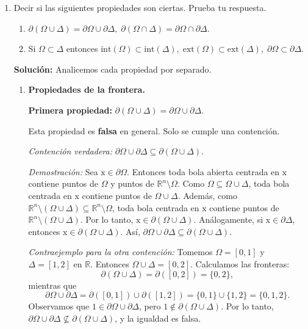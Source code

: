 \documentclass[12pt]{article}
\newcommand{\Ext}{\mathrm{ext}}
\newcommand{\Int}{\mathrm{int}}
\newcommand{\R}{\mathbb R}
\newcommand{\x}{\mathrm x}
\begin{document}
\begin{enumerate}
\item Decir si las siguientes propiedades son ciertas. Prueba tu respuesta.
\begin{enumerate}[(1)]
\item $\partial(\Omega\cup \Delta) = \partial \Omega\cup \partial \Delta,\; 
\partial(\Omega\cap \Delta) = \partial \Omega\cap \partial \Delta$.
\item Si $\Omega\subset \Delta$ entonces $\Int(\Omega)\subset \Int(\Delta),\; \Ext(\Omega)\subset \Ext(\Delta),\; \partial \Omega\subset \partial \Delta$.
\end{enumerate}

\textbf{Solución: } Analicemos cada propiedad por separado.

\begin{enumerate}[(1)]
\item \textbf{Propiedades de la frontera.}

\textbf{Primera propiedad:} $\partial(\Omega\cup \Delta) = \partial \Omega\cup \partial \Delta$.

Esta propiedad es \textbf{falsa} en general. Solo se cumple una contención.

\textit{Contención verdadera:} $\partial \Omega \cup \partial \Delta \subseteq \partial(\Omega \cup \Delta)$.

\textit{Demostración:} Sea $\x \in \partial \Omega$. Entonces toda bola abierta centrada en $\x$ contiene puntos de $\Omega$ y puntos de $\R^n \setminus \Omega$. Como $\Omega \subseteq \Omega \cup \Delta$, toda bola centrada en $\x$ contiene puntos de $\Omega \cup \Delta$. Además, como $\R^n \setminus (\Omega \cup \Delta) \subseteq \R^n \setminus \Omega$, toda bola centrada en $\x$ contiene puntos de $\R^n \setminus (\Omega \cup \Delta)$. Por lo tanto, $\x \in \partial(\Omega \cup \Delta)$. Análogamente, si $\x \in \partial \Delta$, entonces $\x \in \partial(\Omega \cup \Delta)$. Así, $\partial \Omega \cup \partial \Delta \subseteq \partial(\Omega \cup \Delta)$.

\textit{Contraejemplo para la otra contención:} Tomemos $\Omega = [0,1]$ y $\Delta = [1,2]$ en $\R$. Entonces $\Omega \cup \Delta = [0,2]$. Calculamos las fronteras:
\[
\partial(\Omega \cup \Delta) = \partial([0,2]) = \{0, 2\},
\]
mientras que
\[
\partial \Omega \cup \partial \Delta = \partial([0,1]) \cup \partial([1,2]) = \{0, 1\} \cup \{1, 2\} = \{0, 1, 2\}.
\]
Observamos que $1 \in \partial \Omega \cup \partial \Delta$, pero $1 \notin \partial(\Omega \cup \Delta)$. Por lo tanto, $\partial \Omega \cup \partial \Delta \not\subseteq \partial(\Omega \cup \Delta)$, y la igualdad es falsa.


\end{enumerate}
\end{enumerate}
\end{document}
